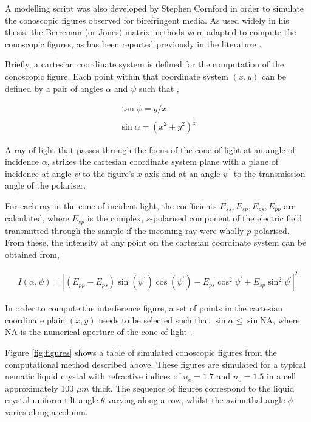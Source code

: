 A modelling script was also developed by Stephen Cornford \cite{Cornford2008} in order to simulate the conoscopic figures observed for birefringent media. As used widely in his thesis, the Berreman \cite{Berreman1972} (or Jones) matrix methods were adapted to compute the conoscopic figures, as has been reported previously in the literature \cite{Ogasawara2001,Parry-Jones2002}.

Briefly, a cartesian coordinate system is defined for the computation of the conoscopic figure. Each point within that coordinate system $\left(x,y\right)$ can be defined by a pair of angles $\alpha$ and $\psi$ such that \cite{Cornford2008},

\begin{eqnarray}
\tan\psi=y/x\\
\sin\alpha=\left(x^2+y^2\right)^{\frac{1}{2}}
\end{eqnarray}

A ray of light that passes through the focus of the cone of light at an angle of incidence $\alpha$, strikes the cartesian coordinate system plane with a plane of incidence at angle $\psi$ to the figure's $x$ axis and at an angle $\psi^{\prime}$ to the transmission angle of the polariser. 

For each ray in the cone of incident light, the coefficients $E_{ss},E_{sp},E_{ps},E_{pp}$ are calculated, where $E_{sp}$ is the complex, $s$-polarised component of the electric field transmitted through the sample if the incoming ray were wholly $p$-polarised. From these, the intensity at any point on the cartesian coordinate system can be obtained \cite{Cornford2008} from,

\begin{align}
I\left(\alpha,\psi\right)=\left|\left(E_{pp}-E_{ps}\right)\sin\left(\psi^{\prime}\right)\cos\left(\psi^{\prime}\right)-E_{ps}\cos^2\psi^{\prime}+E_{sp}\sin^2\psi^{\prime}\right|^2
\end{align}

In order to compute the interference figure, a set of points in the cartesian coordinate plain $\left(x,y\right)$ needs to be selected such that $\sin\alpha\leq\sin\text{NA}$, where NA is the numerical aperture of the cone of light \cite{Cornford2008}.

Figure \ref{fig:figures} shows a table of simulated conoscopic figures from the computational method described above. These figures are simulated for a typical nematic liquid crystal with refractive indices of $n_e=1.7$ and $n_o=1.5$ in  a cell approximately 100 $\mu m$ thick. The sequence of figures correspond to the liquid crystal uniform tilt angle $\theta$ varying along a row, whilst the azimuthal angle $\phi$ varies along a column.

